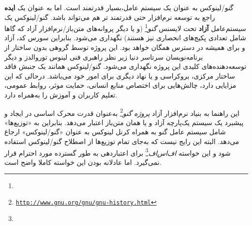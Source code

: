 گنو/لینوکس به عنوان یک سیستم عامل،بسیار قدرتمند است. اما به عنوان یک
{\bfseries ایده}
راجع به توسعه نرم‌افزار حتی قدرتمند تر هم می‌تواند باشد. گنو/لینوکس یک سیستم‌عامل
{\bfseries آزاد}
تحت لایسنس
\emph{گنو}\footnote{}
(و یا دیگر پروانه‌های متن‌باز/نرم‌افزار آزاد که گاها شامل تعدادی پکیج‌های انحصاری نیز هستند) 
نگهداری می‌شود. بنابراین سورس کد، آزاد و برای همیشه در دسترس همگان خواهد بود.
این پروژه توسط گروهی بدون ساختار از برنامه‌نویسان سرتاسر دنیا زیر نظر راهبری فنی
لینوس توروالدز و دیگر توسعه‌دهنده‌های کلیدی این پروژه نگهداری می‌شود.
گنو/لینوکس همانند یک جنبش فاقد ساختار مرکزی، بروکراسی و یا نهاد دیگری برای امور خود می‌باشد.
درحالی که این مزایایی دارد، چالش‌هایی برای اختصاص منابع انسانی، حمایت موثر، روابط عمومی،
تعلیم کاربران و آموزش را به‌همراه دارد.

\begin{note}
این راهنما به بنیاد نرم‌افزار آزاد
\emph{پروژه گنو}\footnote{\texttt{\url{http://www.gnu.org/gnu/gnu-history.html}}}
به‌عنوان قدرت محرک اساسی در ایجاد و پیشبرد یک سیستم یک‌پارچه آزاد و یا همان متن‌باز اعتبار می‌دهد.
بنابراین به «توزیع‌ها» شامل سیستم عامل گنو به همراه کرنل لینوکس به عنوان «گنو/لینوکس» ارجاع می‌دهد.
البته این رایج نیست که به‌جای تمام توزیع‌ها از اصطلاح گنو/لینوکس استفاده شود و این خواسته
\emph{اف‌اس‌اف}\footnote{}
برای اعتباردهی به طور گسترده مورد احترام قرار نمی‌گیرد. اما عادلانه بودن این خواسته کاملا واضح است.
\end{note}


